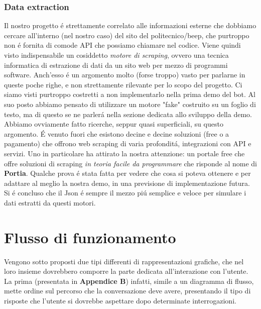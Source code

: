 \documentclass[]{article}
\begin{document}
\subsubsection{Data extraction}
Il nostro progetto é strettamente correlato alle informazioni esterne che dobbiamo cercare all'interno (nel nostro caso) del sito del politecnico/beep, che purtroppo non é fornita di comode API che possiamo chiamare nel codice. Viene quindi visto indispensabile un cosiddetto \textit{motore di scraping}, ovvero una tecnica informatica di estrazione di dati da un sito web per mezzo di programmi software. Anch'esso é un argomento molto (forse troppo) vasto per parlarne in queste poche righe, e non strettamente rilevante per lo scopo del progetto. Ci siamo visti purtroppo costretti a non implementarlo nella prima demo del bot. Al suo posto abbiamo pensato di utilizzare un motore "fake" costruito su un foglio di testo, ma di questo se ne parlerá nella sezione dedicata allo sviluppo della demo. Abbiamo ovviamente fatto ricerche, seppur quasi superficiali, su questo argomento. É venuto fuori che esistono decine e decine soluzioni (free o a pagamento) che offrono web scraping di varia profonditá, integrazioni con API e servizi. Uno in particolare ha attirato la nostra attenzione: un portale free che offre soluzioni di scraping \textit{in teoria facile da programmare} che risponde al nome di \textbf{Portia}. Qualche prova é stata fatta per vedere che cosa si poteva ottenere e per adattare al meglio la nostra demo, in una previsione di implementazione futura. Si é concluso che il Json é sempre il mezzo piú semplice e veloce per simulare i dati estratti da questi motori.

\section{Flusso di funzionamento}
Vengono sotto proposti due tipi differenti di rappresentazioni grafiche, che nel loro insieme dovrebbero comporre la parte dedicata all'interazione con l'utente. \\


La prima (presentata in \textbf{Appendice B}) infatti, simile a un diagramma di flusso, mette ordine sul percorso che la conversazione deve avere, presentando il tipo di risposte che l'utente si dovrebbe aspettare dopo determinate interrogazioni. \\
\end{document}
